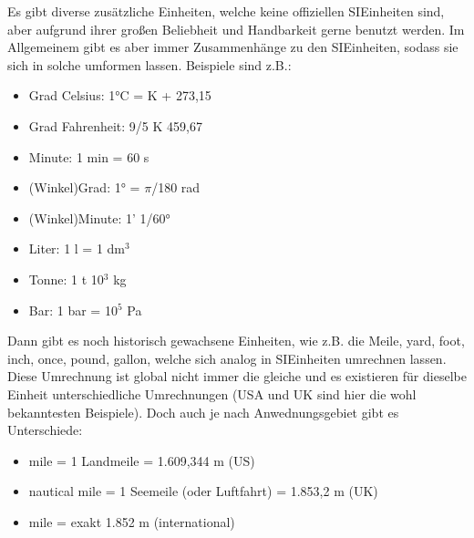 \documentclass[letterpaper,10pt,english]{jupyterBook}
\begin{document}
\sphinxAtStartPar
Es gibt diverse zusätzliche Einheiten, welche keine offiziellen SI\sphinxhyphen{}Einheiten sind, aber aufgrund ihrer großen Beliebheit und Handbarkeit gerne benutzt werden. Im Allgemeinem gibt es aber immer Zusammenhänge zu den SI\sphinxhyphen{}Einheiten, sodass sie sich in solche umformen lassen. Beispiele sind z.B.:
\begin{itemize}
\item {} 
\sphinxAtStartPar
Grad Celsius: 1°C = K + 273,15

\item {} 
\sphinxAtStartPar
Grad Fahrenheit: 9/5 K \sphinxhyphen{} 459,67

\item {} 
\sphinxAtStartPar
Minute: 1 min = 60 s

\item {} 
\sphinxAtStartPar
(Winkel\sphinxhyphen{})Grad: 1° = \(\pi\)/180 rad

\item {} 
\sphinxAtStartPar
(Winkel\sphinxhyphen{})Minute: 1’  1/60°

\item {} 
\sphinxAtStartPar
Liter: 1 l = 1 dm\(^3\)

\item {} 
\sphinxAtStartPar
Tonne: 1 t  10\(^3\) kg

\item {} 
\sphinxAtStartPar
Bar: 1 bar = 10\(^5\) Pa

\end{itemize}

\sphinxAtStartPar
Dann gibt es noch historisch gewachsene Einheiten, wie z.B. die Meile, yard, foot, inch, once, pound, gallon, welche sich analog in SI\sphinxhyphen{}Einheiten umrechnen lassen. Diese Umrechnung ist global nicht immer die gleiche und es existieren für dieselbe Einheit unterschiedliche Umrechnungen (USA und UK sind hier die wohl bekanntesten Beispiele). Doch auch je nach Anwednungsgebiet gibt es Unterschiede:
\begin{itemize}
\item {} 
 mile = 1 Landmeile = 1.609,344 m (US)

\item {} 
 nautical mile = 1 Seemeile (oder Luftfahrt) = 1.853,2 m (UK)

\item {} 
 mile = exakt 1.852 m (international)

\end{itemize}
\end{document}
